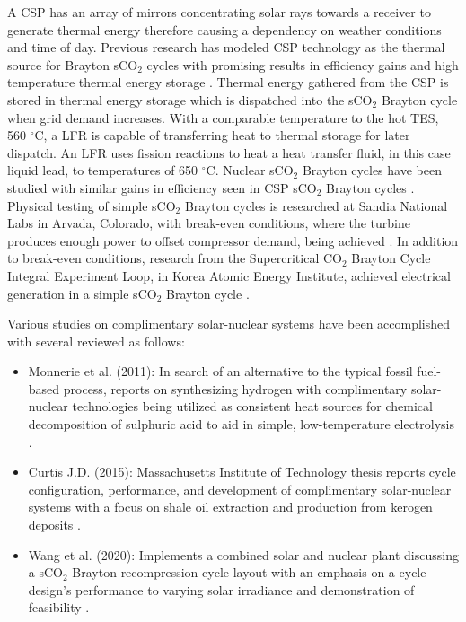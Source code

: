 A CSP has an array of mirrors concentrating solar rays towards a receiver to generate thermal energy therefore causing a dependency on weather conditions and time of day. Previous research has modeled CSP technology as the thermal source for Brayton sCO$_2$ cycles with promising results in efficiency gains and high temperature thermal energy storage \cite{turchi_2013, iverson_2013, ho_2015, wang_2018, neises_2020}. Thermal energy gathered from the CSP is stored in thermal energy storage which is dispatched into the sCO$_2$ Brayton cycle when grid demand increases. With a comparable temperature to the hot TES, 560 $^{\circ}$C, a LFR is capable of transferring heat to thermal storage for later dispatch. An LFR uses fission reactions to heat a heat transfer fluid, in this case liquid lead, to temperatures of 650 $^{\circ}$C. Nuclear sCO$_2$ Brayton cycles have been studied with similar gains in efficiency seen in CSP sCO$_2$ Brayton cycles \cite{ dostal_2004, luo_2020}. Physical testing of simple sCO$_2$ Brayton cycles is researched at Sandia National Labs in Arvada, Colorado, with break-even conditions, where the turbine produces enough power to offset compressor demand, being achieved \cite{wright_2011}. In addition to break-even conditions, research from the Supercritical CO$_2$ Brayton Cycle Integral Experiment Loop, in Korea Atomic Energy Institute, achieved electrical generation in a simple sCO$_2$ Brayton cycle \cite{cha_2016}. 

Various studies on complimentary solar-nuclear systems have been accomplished with several reviewed as follows: 

\begin{itemize}
    \item	Monnerie et al. (2011): In search of an alternative to the typical fossil fuel-based process, reports on synthesizing hydrogen with complimentary solar-nuclear technologies being utilized as consistent heat sources for chemical decomposition of sulphuric acid to aid in simple, low-temperature electrolysis \cite{monnerie_2011}. 
    \item   Curtis J.D. (2015): Massachusetts Institute of Technology thesis reports cycle configuration, performance, and development of complimentary solar-nuclear systems with a focus on shale oil extraction and production from kerogen deposits \cite{curtis_2015}. 
    \item   Wang et al. (2020): Implements a combined solar and nuclear plant discussing a sCO$_2$ Brayton recompression cycle layout with an emphasis on a cycle design's performance to varying solar irradiance and demonstration of feasibility \cite{wang_2020}. 
\end{itemize}

